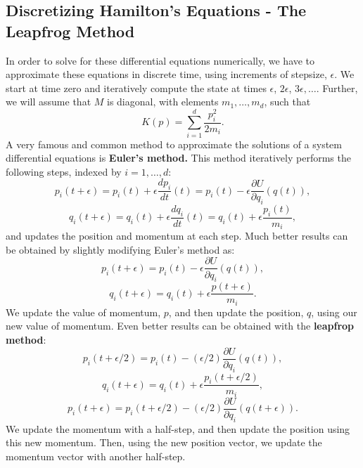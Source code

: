 \documentclass[twoside]{article}
\begin{document}
\subsection{Discretizing Hamilton's Equations - The Leapfrog Method}
In order to solve for these differential equations numerically, we have to approximate these equations in discrete time, using increments of stepsize, $\epsilon$. We start at time zero and iteratively compute the state at times $\epsilon$, $2\epsilon$, $3\epsilon,
\ldots$. Further, we will assume that $M$ is diagonal, with elements $m_1,\ldots,m_d$, such that
$$K(p) = \sum_{i=1}^d \frac{p^2_i}{2m_i}.$$
A very famous and common method to approximate the solutions of a system differential equations is \textbf{Euler's method.} This method iteratively performs the following steps, indexed by $i = 1,\ldots,d:$
$$p_i(t+\epsilon) = p_i(t) + \epsilon\frac{dp_i}{dt}(t) = p_i(t) - \epsilon\frac{\partial U}{\partial q_i}(q(t)),$$
$$q_i(t+\epsilon) = q_i(t) + \epsilon\frac{dq_i}{dt}(t) = q_i(t) + \epsilon\frac{p_i(t)}{m_i},$$
and updates the position and momentum at each step. Much better results can be obtained by slightly modifying Euler's method as:
$$p_i(t+\epsilon) = p_i(t) - \epsilon\frac{\partial U}{\partial q_i}(q(t)),$$
$$q_i(t+\epsilon) = q_i(t) + \epsilon\frac{p(t+\epsilon)}{m_i}.$$
We update the value of momentum, $p$, and then update the position, $q$, using our new value of momentum. Even better results can be obtained with the \textbf{leapfrop method}:
$$p_i(t+\epsilon/2) = p_i(t) - (\epsilon/2)\frac{\partial U}{\partial q_i}(q(t)),$$
$$q_i(t+\epsilon) = q_i(t) + \epsilon\frac{p_i(t+\epsilon/2)}{m_i},$$
$$p_i(t+\epsilon) = p_i(t+\epsilon/2) - (\epsilon/2)\frac{\partial U}{\partial q_i}(q(t+\epsilon)).$$
We update the momentum with a half-step, and then update the position using this new momentum. Then, using the new position vector, we update the momentum vector with another half-step. 
\end{document}
